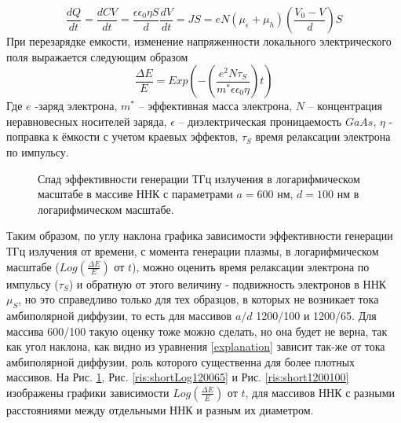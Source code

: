 \documentclass[a4paper,14pt,russian]{extreport}
\begin{document}
				\begin{equation}\label{explanation}
					\frac{dQ}{dt} = \frac{dCV}{dt} = \frac{\epsilon \epsilon_0 \eta S}{d} \frac{dV}{dt} = JS = eN(\mu_{\epsilon}+\mu_{h})\left(\frac{V_0-V}{d}\right)S
				\end{equation}
				При перезарядке емкости, изменение напряженности локального электрического поля выражается следующим образом 
				\begin{equation}\label{Effectivity}
					\frac{\Delta E}{E} = Exp\left(-\left(\frac{e^2N\tau_S}{m^*\epsilon \epsilon_0 \eta}\right)t\right)
				\end{equation}
				Где $e$ -заряд электрона, $m^*$ – эффективная масса электрона, $N$ – концентрация неравновесных носителей заряда, $\epsilon$ – диэлектрическая проницаемость $GaAs$, $\eta$ - поправка к ёмкости с учетом краевых эффектов, $\tau_S$ время релаксации электрона по импульсу.\par
				\begin{figure}[H]
					\caption{Спад эффективности генерации ТГц излучения в логарифмическом масштабе в массиве ННК с параметрами $a = 600 \text{ нм, } d = 100 \text{ нм}$ в логарифмическом масштабе.}
				\label{ris:shortLog600100}
				\end{figure}
				Таким образом, по углу наклона графика зависимости эффективности генерации ТГц излучения от времени, с момента генерации плазмы, в логарифмическом масштабе ($Log\left(\frac{\Delta E}{E}\right)$ от $t$), можно оценить время релаксации электрона по импульсу ($\tau_S$) и обратную от этого величину - подвижность электронов в ННК $\mu_S$, но это справедливо только для тех образцов, в которых не возникает тока амбиполярной диффузии, то есть для массивов $a/d$ 1200/100 и 1200/65. Для массива 600/100 такую оценку тоже можно сделать, но она будет не верна, так как угол наклона, как видно из уравнения \ref{explanation} зависит так-же от тока амбиполярной диффузии, роль которого существенна для более плотных массивов. На Рис.  \ref{ris:shortLog600100}, Рис. \ref{ris:shortLog120065} и Рис. \ref{ris:short1200100} изображены графики зависимости $Log\left(\frac{\Delta E}{E}\right)$ от $t$, для массивов ННК с разными расстояниями между отдельными ННК и разным их диаметром.\par
\end{document}
